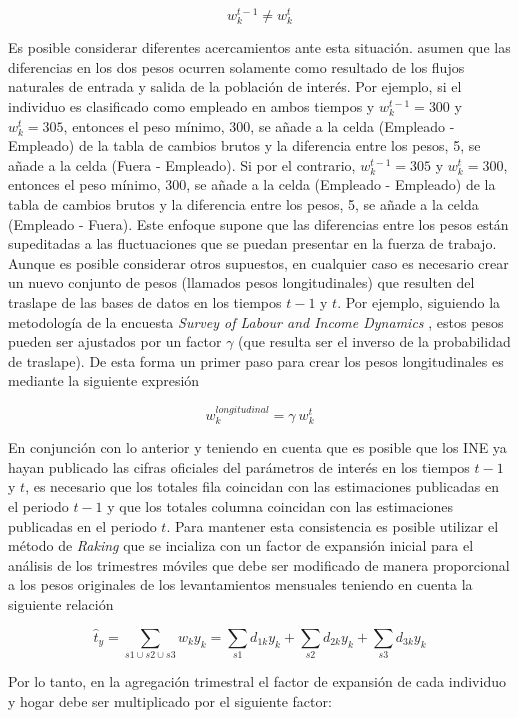 \documentclass[12pt,spanish,]{book}
\begin{document}
\[w_k^{t-1} \neq w_k^t\]

Es posible considerar diferentes acercamientos ante esta situación. \textcite{Feinberg_Stasny_1983} asumen que las diferencias en los dos pesos ocurren solamente como resultado de los flujos naturales de entrada y salida de la población de interés. Por ejemplo, si el individuo es clasificado como empleado en ambos tiempos y \(w_k^{t-1}=300\) y \(w_k^{t}=305\), entonces el peso mínimo, 300, se añade a la celda (Empleado - Empleado) de la tabla de cambios brutos y la diferencia entre los pesos, 5, se añade a la celda (Fuera - Empleado). Si por el contrario, \(w_k^{t-1}=305\) y \(w_k^{t}=300\), entonces el peso mínimo, 300, se añade a la celda (Empleado - Empleado) de la tabla de cambios brutos y la diferencia entre los pesos, 5, se añade a la celda (Empleado - Fuera). Este enfoque supone que las diferencias entre los pesos están supeditadas a las fluctuaciones que se puedan presentar en la fuerza de trabajo. Aunque es posible considerar otros supuestos, en cualquier caso es necesario crear un nuevo conjunto de pesos (llamados pesos longitudinales) que resulten del traslape de las bases de datos en los tiempos \(t-1\) y \(t\). Por ejemplo, siguiendo la metodología de la encuesta \emph{Survey of Labour and Income Dynamics} \autocites{Naud_2002}{LaRoche_2003}, estos pesos pueden ser ajustados por un factor \(\gamma\) (que resulta ser el inverso de la probabilidad de traslape). De esta forma un primer paso para crear los pesos longitudinales es mediante la siguiente expresión

\[w_k^{longitudinal} = \gamma \  w_k^{t}\]

En conjunción con lo anterior y teniendo en cuenta que es posible que los INE ya hayan publicado las cifras oficiales del parámetros de interés en los tiempos \(t-1\) y \(t\), es necesario que los totales fila coincidan con las estimaciones publicadas en el periodo \(t-1\) y que los totales columna coincidan con las estimaciones publicadas en el periodo \(t\). Para mantener esta consistencia es posible utilizar el método de \emph{Raking} que se incializa con un factor de expansión inicial para el análisis de los trimestres móviles que debe ser modificado de manera proporcional a los pesos originales de los levantamientos mensuales teniendo en cuenta la siguiente relación

\[
\hat{t}_y = \sum_{s1 \cup s2 \cup s3} w_k y_k
= \sum_{s1} d_{1k} y_k + \sum_{s2} d_{2k} y_k + \sum_{s3} d_{3k} y_k
\]

Por lo tanto, en la agregación trimestral el factor de expansión de cada individuo y hogar debe ser multiplicado por el siguiente factor:
\end{document}
